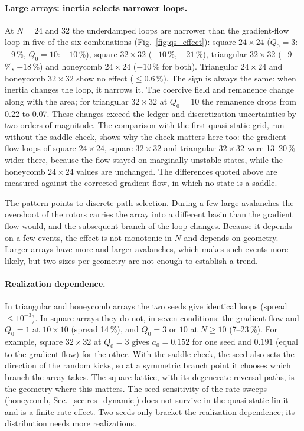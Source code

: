\documentclass[11pt,a4paper]{article}
\begin{document}
\paragraph{Large arrays: inertia selects narrower loops.} At $N=24$ and $32$ the underdamped loops are narrower than the gradient-flow loop in five of the six combinations (Fig.~\ref{fig:qs_effect}): square $24\times24$ ($Q_0=3$: $-9$\,\%, $Q_0=10$: $-10$\,\%), square $32\times32$ ($-10$\,\%, $-21$\,\%), triangular $32\times32$ ($-9$\,\%, $-18$\,\%) and honeycomb $24\times24$ ($-10$\,\% for both). Triangular $24\times24$ and honeycomb $32\times32$ show no effect ($\le0.6$\,\%). The sign is always the same: when inertia changes the loop, it narrows it. The coercive field and remanence change along with the area; for triangular $32\times32$ at $Q_0=10$ the remanence drops from 0.22 to 0.07. These changes exceed the ledger and discretization uncertainties by two orders of magnitude. The comparison with the first quasi-static grid, run without the saddle check, shows why the check matters here too: the gradient-flow loops of square $24\times24$, square $32\times32$ and triangular $32\times32$ were 13--20\,\% wider there, because the flow stayed on marginally unstable states, while the honeycomb $24\times24$ values are unchanged. The differences quoted above are measured against the corrected gradient flow, in which no state is a saddle.

The pattern points to discrete path selection. During a few large avalanches the overshoot of the rotors carries the array into a different basin than the gradient flow would, and the subsequent branch of the loop changes. Because it depends on a few events, the effect is not monotonic in $N$ and depends on geometry. Larger arrays have more and larger avalanches, which makes such events more likely, but two sizes per geometry are not enough to establish a trend.

\paragraph{Realization dependence.} In triangular and honeycomb arrays the two seeds give identical loops (spread $\le10^{-3}$). In square arrays they do not, in seven conditions: the gradient flow and $Q_0=1$ at $10\times10$ (spread 14\,\%), and $Q_0=3$ or $10$ at $N\ge10$ (7--23\,\%). For example, square $32\times32$ at $Q_0=3$ gives $a_0=0.152$ for one seed and $0.191$ (equal to the gradient flow) for the other. With the saddle check, the seed also sets the direction of the random kicks, so at a symmetric branch point it chooses which branch the array takes. The square lattice, with its degenerate reversal paths, is the geometry where this matters. The seed sensitivity of the rate sweeps (honeycomb, Sec.~\ref{sec:res_dynamic}) does not survive in the quasi-static limit and is a finite-rate effect. Two seeds only bracket the realization dependence; its distribution needs more realizations.
\end{document}
